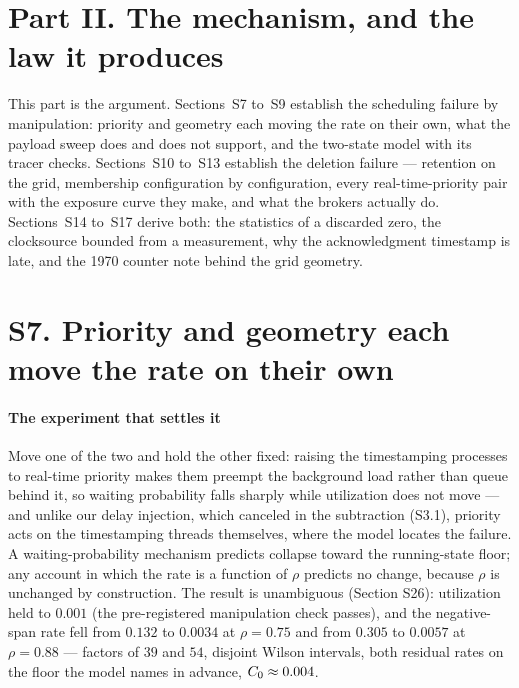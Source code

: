 \documentclass[10pt,journal,onecolumn]{IEEEtran}
\begin{document}
\section*{Part II. The mechanism, and the law it produces}

This part is the argument. Sections~S7 to~S9 establish the scheduling failure by manipulation: priority and geometry each moving the rate on their own, what the payload sweep does and does not support, and the two-state model with its tracer checks. Sections~S10 to~S13 establish the deletion failure --- retention on the grid, membership configuration by configuration, every real-time-priority pair with the exposure curve they make, and what the brokers actually do. Sections~S14 to~S17 derive both: the statistics of a discarded zero, the clocksource bounded from a measurement, why the acknowledgment timestamp is late, and the 1970 counter note behind the grid geometry.

\section{S7. Priority and geometry each move the rate on their own}

\paragraph{The experiment that settles it} Move one of the two and hold the other fixed:
raising the timestamping processes to real-time priority makes them preempt the background load
rather than queue behind it, so waiting probability falls sharply while utilization does not move ---
and unlike our delay injection, which canceled in the subtraction (S3.1), priority acts on the timestamping threads themselves, where the model
locates the failure. A waiting-probability mechanism predicts collapse toward the running-state floor;
any account in which the rate is a function of $\rho$ predicts no change, because $\rho$ is
unchanged by construction. The result is unambiguous (Section S26): utilization held
to $0.001$ (the pre-registered manipulation check passes), and the negative-span rate fell from
$0.132$ to $0.0034$ at $\rho = 0.75$ and from $0.305$ to $0.0057$ at $\rho = 0.88$ ---
factors of $39$ and $54$, disjoint Wilson intervals, both residual rates on the floor the
model names in advance, $C_0 \approx 0.004$.
\end{document}
